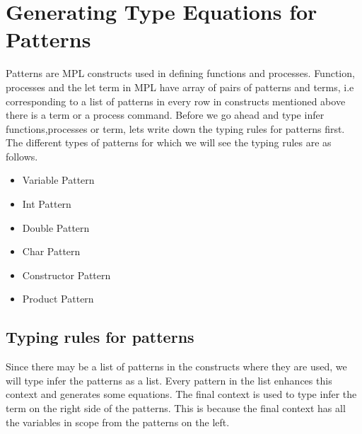 \documentclass[11pt]{article}
\begin{document}
\section {Generating Type Equations for Patterns}
Patterns are MPL constructs used in defining functions and processes. Function, processes and the let term in MPL have array of pairs of patterns and terms, i.e corresponding to a list of patterns in every row in constructs mentioned above there is a  term or a process command. Before we go ahead and type infer functions,processes or term, lets write down the typing rules for patterns first.
The different types of patterns for which we will see the typing rules  are as follows.
\begin{itemize}
  \item Variable Pattern
  \item Int Pattern
  \item Double Pattern
  \item Char Pattern
  \item Constructor Pattern
  \item Product Pattern
\end {itemize}

\subsection {Typing rules for patterns}
Since there may be a list of patterns in the constructs where they are used, we will type infer the patterns as a list. Every pattern in the list enhances this context and generates some equations. The final context is used to type infer the term on the right side of the patterns. This is because the final context has all the variables in scope from the patterns on the left.
\end{document}

